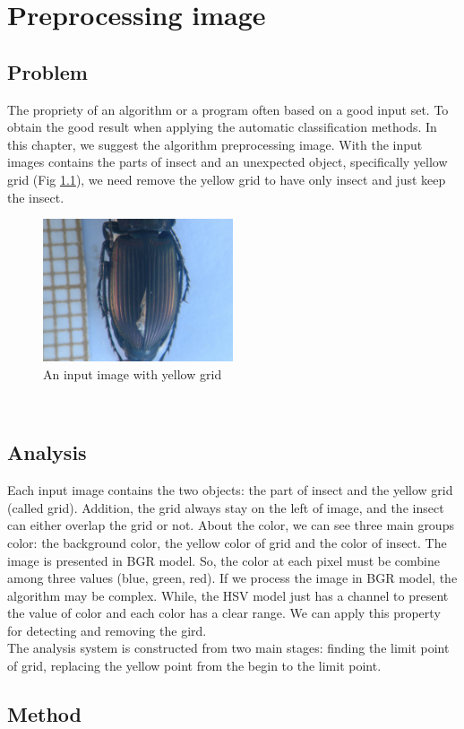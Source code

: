 \chapter{Preprocessing image}
\section{Problem}
The propriety of an algorithm or a program often based on a good input set. To obtain the good result when applying the automatic classification methods. In this chapter, we suggest the algorithm preprocessing image. With the input images contains the parts of insect and an unexpected object, specifically yellow grid (Fig \ref{fig:Figure_1}), we need remove the yellow grid to have only insect and just keep the insect.
\begin{figure}[h!]
\centering
\includegraphics[width=0.5\textwidth]{./images/input}
\caption{An input image with yellow grid}
\label{fig:Figure_1}
\end{figure}\\
\section{Analysis}
Each input image contains the two objects: the part of insect and the yellow grid (called grid). Addition, the grid always stay on the left of image, and the insect can either overlap the grid or not. About the color, we can see three main groups color: the background color, the yellow color of grid and the color of insect. The image is presented in BGR model. So, the color at each pixel must be combine among three values (blue, green, red). If we process the image in BGR model, the algorithm may be complex. While, the HSV model just has a channel to present the value of color and each color has a clear range. We can apply this property for detecting and removing the gird.\\
The analysis system is constructed from two main stages: finding the limit point of grid, replacing the yellow point from the begin to the limit point.
\section{Method}